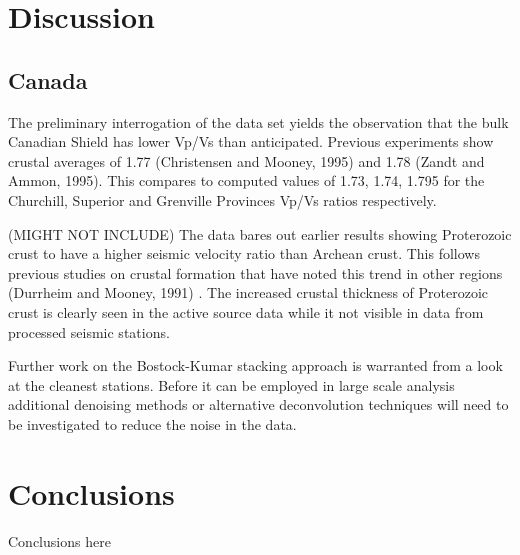 \documentclass[draft, 12pt]{article}
\begin{document}
\section{Discussion}
\subsection{Canada}

  The preliminary interrogation of the data set yields the observation that the bulk Canadian Shield has lower Vp/Vs than anticipated. Previous experiments show crustal averages of 1.77 (Christensen and Mooney, 1995) and 1.78 (Zandt and Ammon, 1995). This compares to computed values of 1.73, 1.74, 1.795 for the Churchill, Superior and Grenville Provinces Vp/Vs ratios respectively.


(MIGHT NOT INCLUDE)  The data bares out earlier results showing Proterozoic crust to have a higher seismic velocity ratio than Archean crust. This follows previous studies on crustal formation that have noted this trend in other regions (Durrheim and Mooney, 1991) . The increased crustal thickness of Proterozoic crust is clearly seen in the active source data while it not visible in data from processed seismic stations.

  Further work on the Bostock-Kumar stacking approach is warranted from a look at the cleanest stations. Before it can be employed in large scale analysis additional denoising methods or alternative deconvolution techniques will need to be investigated to reduce the noise in the data.


\section{Conclusions}
Conclusions here

\end{document}
